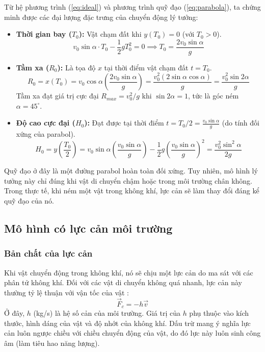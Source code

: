 Từ hệ phương trình (\ref{eq:ideal}) và phương trình quỹ đạo (\ref{eq:parabola}), ta chứng minh được các đại lượng đặc trưng của chuyển động lý tưởng:

\begin{itemize}
    \item \textbf{Thời gian bay ($T_0$):} Vật chạm đất khi $y(T_0) = 0$ (với $T_0 > 0$).
    \begin{equation*}
    v_0 \sin\alpha \cdot T_0 - \frac{1}{2}gT_0^2 = 0 \implies T_0 = \frac{2v_0\sin\alpha}{g}
    \end{equation*}
    
    \item \textbf{Tầm xa ($R_0$):} Là tọa độ $x$ tại thời điểm vật chạm đất $t = T_0$.
    \begin{equation*}
    R_0 = x(T_0) = v_0 \cos\alpha \left( \frac{2v_0\sin\alpha}{g} \right) = \frac{v_0^2 (2\sin\alpha\cos\alpha)}{g} = \frac{v_0^2\sin 2\alpha}{g}
    \end{equation*}
    Tầm xa đạt giá trị cực đại $R_{max} = v_0^2/g$ khi $\sin 2\alpha = 1$, tức là góc ném $\alpha = 45^\circ$.
    
    \item \textbf{Độ cao cực đại ($H_0$):} Đạt được tại thời điểm $t = T_0 / 2 = \frac{v_0\sin\alpha}{g}$ (do tính đối xứng của parabol).
    \begin{equation*}
    H_0 = y\left(\frac{T_0}{2}\right) = v_0 \sin\alpha \left( \frac{v_0\sin\alpha}{g} \right) - \frac{1}{2}g \left( \frac{v_0\sin\alpha}{g} \right)^2 = \frac{v_0^2\sin^2\alpha}{2g}
    \end{equation*}
\end{itemize}

Quỹ đạo ở đây là một đường parabol hoàn toàn đối xứng. Tuy nhiên, mô hình lý tưởng này chỉ đúng khi vật di chuyển chậm hoặc trong môi trường chân không. Trong thực tế, khi ném một vật trong không khí, lực cản sẽ làm thay đổi đáng kể quỹ đạo của nó.

\subsection{Mô hình có lực cản môi trường}
\subsubsection{Bản chất của lực cản}
Khi vật chuyển động trong không khí, nó sẽ chịu một lực cản do ma sát với các phân tử không khí. Đối với các vật di chuyển không quá nhanh, lực cản này thường tỷ lệ thuận với vận tốc của vật \cite{halliday2013fundamentals}:
\begin{equation}
\vec{F}_{c} = -h\vec{v}
\label{eq:drag}
\end{equation}
Ở đây, $h$ (kg/s) là hệ số cản của môi trường. Giá trị của $h$ phụ thuộc vào kích thước, hình dáng của vật và độ nhớt của không khí. Dấu trừ mang ý nghĩa lực cản luôn ngược chiều với chiều chuyển động của vật, do đó lực này luôn sinh công âm (làm tiêu hao năng lượng).

